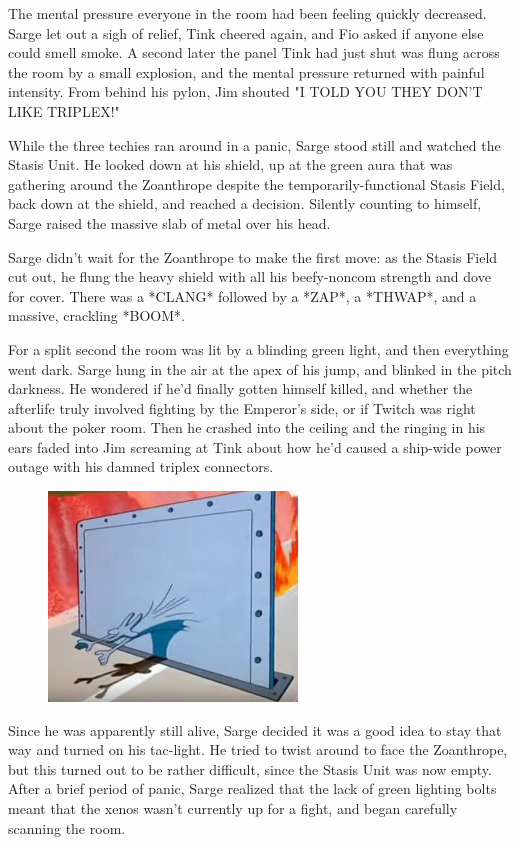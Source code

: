 The mental pressure everyone in the room had been feeling quickly decreased. 
Sarge let out a sigh of relief, Tink cheered again, and Fio asked if anyone else could smell smoke. 
A second later the panel Tink had just shut was flung across the room by a small explosion, and the mental pressure returned with painful intensity. 
From behind his pylon, Jim shouted "I TOLD YOU THEY DON'T LIKE TRIPLEX!" 

While the three techies ran around in a panic, Sarge stood still and watched the Stasis Unit. 
He looked down at his shield, up at the green aura that was gathering around the Zoanthrope despite the temporarily-functional Stasis Field, back down at the shield, and reached a decision. 
Silently counting to himself, Sarge raised the massive slab of metal over his head.

Sarge didn't wait for the Zoanthrope to make the first move: 
as the Stasis Field cut out, he flung the heavy shield with all his beefy-noncom strength and dove for cover. 
There was a *CLANG* followed by a *ZAP*, a *THWAP*, and a massive, crackling *BOOM*.

For a split second the room was lit by a blinding green light, and then everything went dark. 
Sarge hung in the air at the apex of his jump, and blinked in the pitch darkness. 
He wondered if he'd finally gotten himself killed, and whether the afterlife truly involved fighting by the Emperor's side, or if Twitch was right about the poker room. 
Then he crashed into the ceiling and the ringing in his ears faded into Jim screaming at Tink about how he'd caused a ship-wide power outage with his damned triplex connectors.

\begin{figure}
	\begin{center}
		\includegraphics[width=\figwidth]{pics/13/9.png}
	\end{center}
\end{figure}
Since he was apparently still alive, Sarge decided it was a good idea to stay that way and turned on his tac-light. 
He tried to twist around to face the Zoanthrope, but this turned out to be rather difficult, since the Stasis Unit was now empty. 
After a brief period of panic, Sarge realized that the lack of green lighting bolts meant that the xenos wasn't currently up for a fight, and began carefully scanning the room. 


